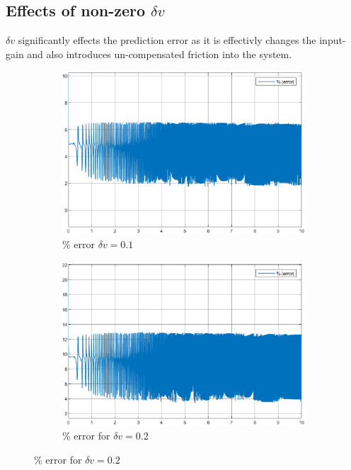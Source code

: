 \subsection{Effects of non-zero $\delta v$}
$\delta v$ significantly effects the prediction error as it is effectivly
changes the input-gain and also introduces un-compensated friction into the
system.
\begin{figure}[H]
\begin{minipage}{0.49\textwidth}
    \begin{figure}[H]
        \includegraphics[width = \textwidth]{figs/par_var/1_del_v.eps}
        \caption{$\%$ error $\delta v = 0.1$}
    \end{figure}
\end{minipage}
\begin{minipage}{0.49\textwidth}
    \begin{figure}[H]
        \includegraphics[width = \textwidth]{figs/par_var/2_del_v.eps}
        \caption{$\%$ error for $\delta v = 0.2$}
    \end{figure}
\end{minipage}
\end{figure}


